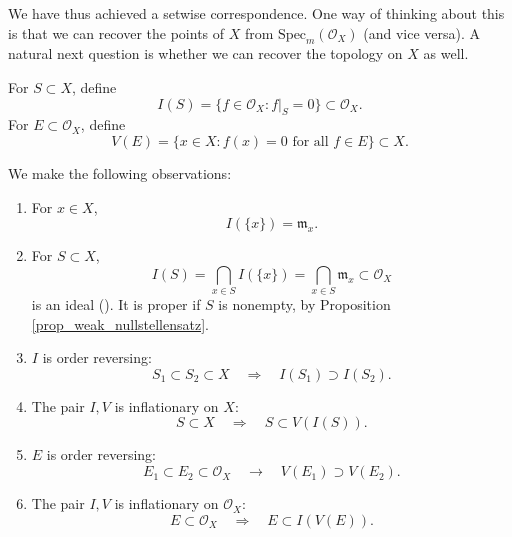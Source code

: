 \documentclass[12pt]{article}
\begin{document}
We have thus achieved a setwise correspondence. One way of thinking about this is that we can recover the points of $X$ from $\text{Spec}_m(\mathcal{O}_X)$ (and vice versa). A natural next question is whether we can recover the topology on $X$ as well.

\begin{definition}
	For $S\subset X$, define 
	\begin{equation*}
		I(S) = \{f\in \mathcal{O}_X : f|_S=0 \} \subset \mathcal{O}_X.
	\end{equation*}
	For $E\subset \mathcal{O}_X$, define 
	\begin{equation*}
		V(E) = \{x\in X : f(x)=0 \text{ for all } f\in E \} \subset X.
	\end{equation*}
\end{definition}

\begin{proposition}
	We make the following observations:
	\begin{enumerate}
		\item For $x\in X$, 
			\begin{equation*}
				I(\{x\}) = \mathfrak{m}_x.
			\end{equation*}
		\item For $S\subset X$, 
			\begin{equation*}
				I(S) = \bigcap_{x\in S} I(\{x\}) = \bigcap_{x\in S}\mathfrak{m}_x \subset \mathcal{O}_X
			\end{equation*}
			is an ideal (). It is proper if $S$ is nonempty, by Proposition \ref{prop_weak_nullstellensatz}.
		\item $I$ is order reversing: 
			\begin{equation*}
				S_1\subset S_2\subset X \quad \Rightarrow \quad I(S_1) \supset I(S_2).
			\end{equation*}
		\item The pair $I,V$ is inflationary on $X$:
			\begin{equation*}
				S\subset X \quad \Rightarrow \quad S\subset V(I(S)).
			\end{equation*}
		\item $E$ is order reversing: 
			\begin{equation*}
				E_1\subset E_2\subset \mathcal{O}_X \quad \rightarrow \quad V(E_1) \supset V(E_2).
			\end{equation*}
		\item The pair $I, V$ is inflationary on $\mathcal{O}_X$:
			\begin{equation*}
				E\subset \mathcal{O}_X \quad \Rightarrow \quad E\subset I(V(E)).
			\end{equation*}
	\end{enumerate}
\end{proposition}
\end{document}

